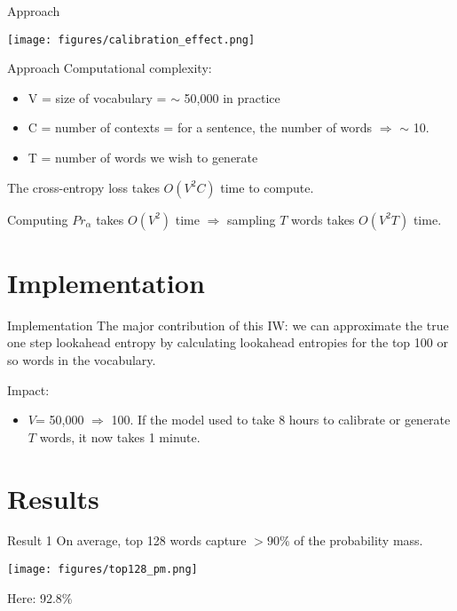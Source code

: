 \documentclass{beamer}
\begin{document}
\begin{frame}{Approach}
    \begin{center}
        \texttt{[image: figures/calibration\_effect.png]}
    \end{center}
\end{frame}

\begin{frame}{Approach}
Computational complexity:
\begin{itemize}
    \item V = size of vocabulary = $\sim$ 50,000 in practice
    \item C = number of contexts = for a sentence, the number of words $\Rightarrow$ $\sim$ 10. 
    \item T = number of words we wish to generate
\end{itemize}
\pause
The cross-entropy loss takes $O(V^2C)$ time to compute. 

Computing $Pr_\alpha$ takes $O(V^2)$ time $\Rightarrow$ sampling $T$ words takes $O(V^2T)$ time.
\end{frame}

\section{Implementation}
\begin{frame}{Implementation}
    The major contribution of this IW: we can approximate the true one step lookahead entropy by calculating lookahead entropies for the top 100 or so words in the vocabulary.
    \pause

    Impact:
    \begin{itemize}
        \item $V$= 50,000 $\Rightarrow$ 100. If the model used to take 8 hours to calibrate or generate $T$ words, it now takes 1 minute.
    \end{itemize}
\end{frame}

\section{Results}
\begin{frame}{Result 1}
    On average, top 128 words capture $>90\%$ of the probability mass.
    \begin{center}
        \texttt{[image: figures/top128\_pm.png]}
    \end{center}
    Here: 92.8\%
\end{frame}
\end{document}
